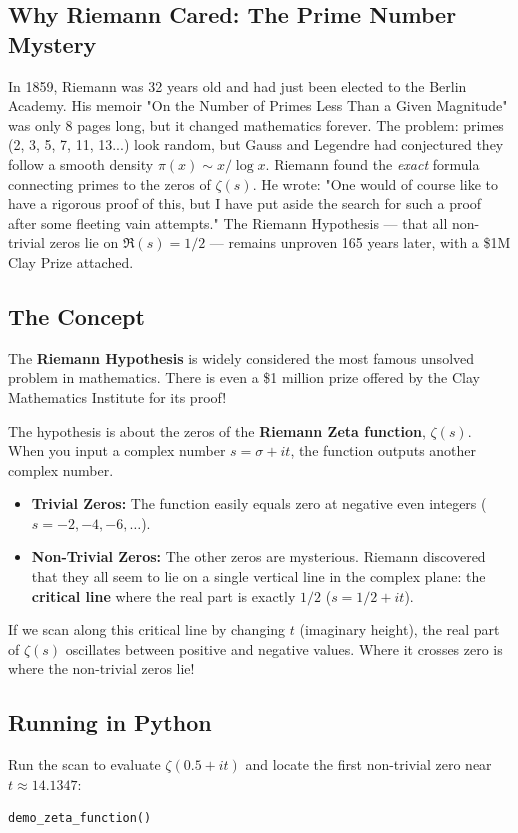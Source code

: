 \documentclass[11pt]{article}
\begin{document}
\subsection{Why Riemann Cared: The Prime Number Mystery}
In 1859, Riemann was 32 years old and had just been elected to the Berlin Academy. His memoir "On the Number of Primes Less Than a Given Magnitude" was only 8 pages long, but it changed mathematics forever. The problem: primes (2, 3, 5, 7, 11, 13...) look random, but Gauss and Legendre had conjectured they follow a smooth density $\pi(x) \sim x/\log x$. Riemann found the \textit{exact} formula connecting primes to the zeros of $\zeta(s)$. He wrote: "One would of course like to have a rigorous proof of this, but I have put aside the search for such a proof after some fleeting vain attempts." The Riemann Hypothesis --- that all non-trivial zeros lie on $\Re(s)=1/2$ --- remains unproven 165 years later, with a \$1M Clay Prize attached.

\subsection{The Concept}
The \textbf{Riemann Hypothesis} is widely considered the most famous unsolved problem in mathematics. There is even a \$1 million prize offered by the Clay Mathematics Institute for its proof!

The hypothesis is about the zeros of the \textbf{Riemann Zeta function}, $\zeta(s)$. When you input a complex number $s = \sigma + it$, the function outputs another complex number.
\begin{itemize}
    \item \textbf{Trivial Zeros:} The function easily equals zero at negative even integers ($s = -2, -4, -6, \dots$).
    \item \textbf{Non-Trivial Zeros:} The other zeros are mysterious. Riemann discovered that they all seem to lie on a single vertical line in the complex plane: the \textbf{critical line} where the real part is exactly $1/2$ ($s = 1/2 + it$).
\end{itemize}
If we scan along this critical line by changing $t$ (imaginary height), the real part of $\zeta(s)$ oscillates between positive and negative values. Where it crosses zero is where the non-trivial zeros lie!

\subsection{Running in Python}
Run the scan to evaluate $\zeta(0.5 + it)$ and locate the first non-trivial zero near $t \approx 14.1347$:
\begin{lstlisting}
demo_zeta_function()
\end{lstlisting}
\end{document}

